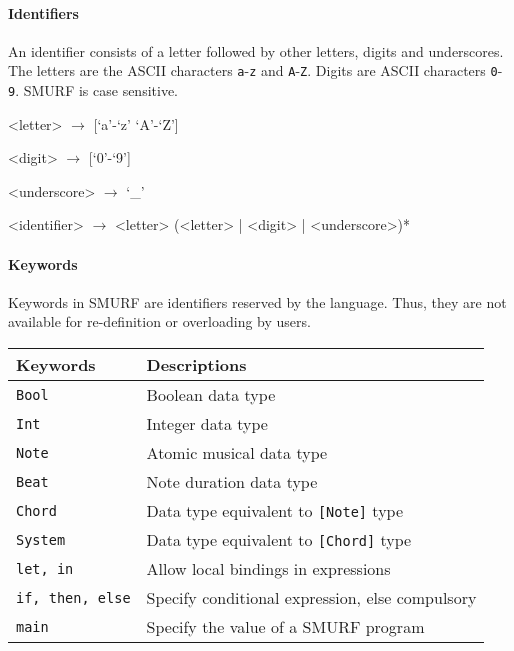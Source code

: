 \paragraph{Identifiers}
\label{sec:identifiers}
An identifier consists of a letter followed by other letters, 
digits and underscores. The letters are the ASCII characters \texttt{a}-\texttt{z} and
\texttt{A}-\texttt{Z}. Digits are ASCII characters \texttt{0}-\texttt{9}. SMURF is case sensitive.

\begin{grammar}
<letter> $\rightarrow$ [`a'-`z' `A'-`Z'] 

<digit> $\rightarrow$ [`0'-`9'] 

<underscore> $\rightarrow$ {`_'} 

<identifier> $\rightarrow$ <letter> (<letter> | <digit> | <underscore>)*
\end{grammar}

\paragraph{Keywords}
\label{sec:keywords}
Keywords in SMURF are identifiers reserved by the language. Thus, they are not available for
re-definition or overloading by users. 

\begin{table} [H]
	\centering
    \begin{tabular}{ll}
    \hline\hline
    Keywords & Descriptions \\ 
    \hline\hline
      \texttt{Bool} & Boolean data type \\ \hline
      \texttt{Int} & Integer data type \\ \hline
      \texttt{Note} & Atomic musical data type \\ \hline
      \texttt{Beat} & Note duration data type\\ \hline
      \texttt{Chord} & Data type equivalent to \texttt{[Note]} type \\ \hline
      \texttt{System} & Data type equivalent to \texttt{[Chord]} type \\ \hline
      \texttt{let, in} & Allow local bindings in expressions  \\ \hline
      \texttt{if, then, else} & Specify conditional expression, else compulsory  \\ \hline
      \texttt{main} & Specify the value of a SMURF program\\ \hline
    \end{tabular}
\end{table}


